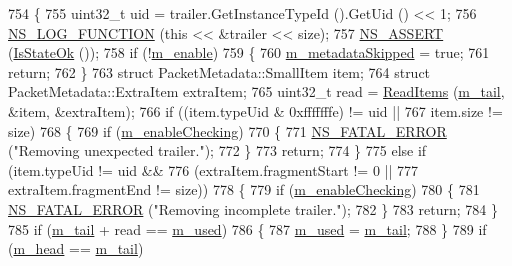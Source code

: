 \begin{DoxyCode}
754 \{
755   uint32\_t uid = trailer.GetInstanceTypeId ().GetUid () << 1;
756   \hyperlink{log-macros-disabled_8h_a90b90d5bad1f39cb1b64923ea94c0761}{NS\_LOG\_FUNCTION} (\textcolor{keyword}{this} << &trailer << size);
757   \hyperlink{assert_8h_a6dccdb0de9b252f60088ce281c49d052}{NS\_ASSERT} (\hyperlink{classns3_1_1PacketMetadata_a208d3163e28704438cdd4d30318e489c}{IsStateOk} ());
758   \textcolor{keywordflow}{if} (!\hyperlink{classns3_1_1PacketMetadata_a666ea556ffbd8f2226195cde1abe7ae7}{m\_enable}) 
759     \{
760       \hyperlink{classns3_1_1PacketMetadata_ac370960e8881e5a7280122e9dc5f7ace}{m\_metadataSkipped} = \textcolor{keyword}{true};
761       \textcolor{keywordflow}{return};
762     \}
763   \textcolor{keyword}{struct }PacketMetadata::SmallItem item;
764   \textcolor{keyword}{struct }PacketMetadata::ExtraItem extraItem;
765   uint32\_t read = \hyperlink{classns3_1_1PacketMetadata_a3719ad2c32313a9a1c74462322e8b517}{ReadItems} (\hyperlink{classns3_1_1PacketMetadata_ad24a659e236af7b98c475c97c4f60db9}{m\_tail}, &item, &extraItem);
766   \textcolor{keywordflow}{if} ((item.typeUid & 0xfffffffe) != uid ||
767       item.size != size)
768     \{
769       \textcolor{keywordflow}{if} (\hyperlink{classns3_1_1PacketMetadata_a3b4333cb8df79817e7ca74de1a090d89}{m\_enableChecking})
770         \{
771           \hyperlink{group__fatal_ga5131d5e3f75d7d4cbfd706ac456fdc85}{NS\_FATAL\_ERROR} (\textcolor{stringliteral}{"Removing unexpected trailer."});
772         \}
773       \textcolor{keywordflow}{return};
774     \}
775   \textcolor{keywordflow}{else} \textcolor{keywordflow}{if} (item.typeUid != uid &&
776            (extraItem.fragmentStart != 0 ||
777             extraItem.fragmentEnd != size))
778     \{
779       \textcolor{keywordflow}{if} (\hyperlink{classns3_1_1PacketMetadata_a3b4333cb8df79817e7ca74de1a090d89}{m\_enableChecking})
780         \{
781           \hyperlink{group__fatal_ga5131d5e3f75d7d4cbfd706ac456fdc85}{NS\_FATAL\_ERROR} (\textcolor{stringliteral}{"Removing incomplete trailer."});
782         \}
783       \textcolor{keywordflow}{return};
784     \}
785   \textcolor{keywordflow}{if} (\hyperlink{classns3_1_1PacketMetadata_ad24a659e236af7b98c475c97c4f60db9}{m\_tail} + read == \hyperlink{classns3_1_1PacketMetadata_afeecb22fe6f3368f3c56bda755892df9}{m\_used})
786     \{
787       \hyperlink{classns3_1_1PacketMetadata_afeecb22fe6f3368f3c56bda755892df9}{m\_used} = \hyperlink{classns3_1_1PacketMetadata_ad24a659e236af7b98c475c97c4f60db9}{m\_tail};
788     \}
789   \textcolor{keywordflow}{if} (\hyperlink{classns3_1_1PacketMetadata_a46b3ef0a9a80a798ad1e81b5694a5658}{m\_head} == \hyperlink{classns3_1_1PacketMetadata_ad24a659e236af7b98c475c97c4f60db9}{m\_tail})

\end{DoxyCode}
